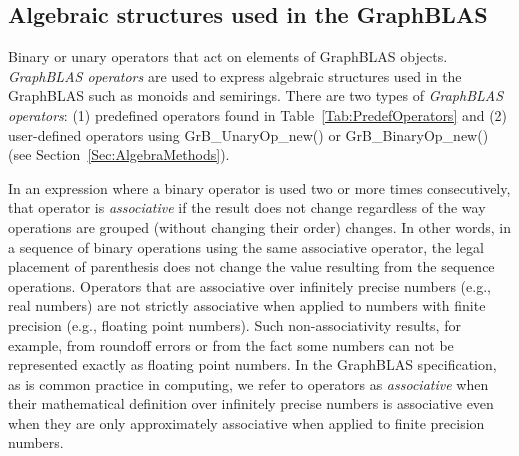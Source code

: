 

\glossEnd



\subsection{Algebraic structures used in the GraphBLAS}

\glossBegin
{} Binary or unary operators that act on elements of GraphBLAS 
objects.  \emph{GraphBLAS operators} are used to express algebraic structures used in the 
GraphBLAS such as monoids and semirings. There are two types of \emph{GraphBLAS operators}: 
(1) predefined operators found in Table~\ref{Tab:PredefOperators} and (2) user-defined 
operators using {\sf GrB\_UnaryOp\_new()} or {\sf GrB\_BinaryOp\_new()} 
(see Section~\ref{Sec:AlgebraMethods}).

 In an expression where a binary operator is used 
two or more times consecutively, that operator is \emph{associative} if the result 
does not change regardless of the way operations are grouped (without changing their order) 
changes. In other words, in a sequence of binary operations using the same associative 
operator, the legal placement of parenthesis does not change the value resulting 
from the sequence operations.  Operators that are associative over infinitely 
precise numbers (e.g., real numbers) are not strictly associative when applied to 
numbers with finite precision (e.g., floating point numbers). Such non-associativity 
results, for example, from roundoff errors or from the fact some numbers can not 
be represented exactly as floating point numbers.   In the GraphBLAS specification, 
as is common practice in computing, we refer to operators as \emph{associative} 
when their mathematical definition over infinitely precise numbers is associative 
even when they are only approximately associative when applied to finite precision 
numbers.

